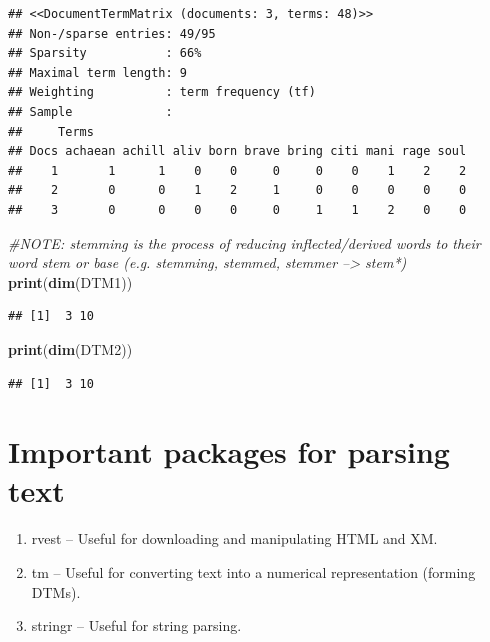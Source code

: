 \documentclass[]{book}
\newenvironment{Shaded}{\begin{snugshade}}{\end{snugshade}}
\newcommand{\KeywordTok}[1]{\textcolor[rgb]{0.13,0.29,0.53}{\textbf{#1}}}
\newcommand{\CommentTok}[1]{\textcolor[rgb]{0.56,0.35,0.01}{\textit{#1}}}
\newcommand{\NormalTok}[1]{#1}
\providecommand{\tightlist}{%
  \setlength{\itemsep}{0pt}\setlength{\parskip}{0pt}}
\theoremstyle{definition}
\theoremstyle{definition}
\theoremstyle{definition}
\theoremstyle{remark}
\begin{document}
\begin{verbatim}
## <<DocumentTermMatrix (documents: 3, terms: 48)>>
## Non-/sparse entries: 49/95
## Sparsity           : 66%
## Maximal term length: 9
## Weighting          : term frequency (tf)
## Sample             :
##     Terms
## Docs achaean achill aliv born brave bring citi mani rage soul
##    1       1      1    0    0     0     0    0    1    2    2
##    2       0      0    1    2     1     0    0    0    0    0
##    3       0      0    0    0     0     1    1    2    0    0
\end{verbatim}

\begin{Shaded}
\begin{Highlighting}[]
\CommentTok{#NOTE: stemming is the process of reducing inflected/derived words to their word stem or base (e.g. stemming, stemmed, stemmer --> stem*)}
\KeywordTok{print}\NormalTok{(}\KeywordTok{dim}\NormalTok{(DTM1))}
\end{Highlighting}
\end{Shaded}

\begin{verbatim}
## [1]  3 10
\end{verbatim}

\begin{Shaded}
\begin{Highlighting}[]
\KeywordTok{print}\NormalTok{(}\KeywordTok{dim}\NormalTok{(DTM2))}
\end{Highlighting}
\end{Shaded}

\begin{verbatim}
## [1]  3 10
\end{verbatim}

\section{Important packages for parsing
text}\label{important-packages-for-parsing-text}

\begin{enumerate}
\def\labelenumi{\arabic{enumi}.}
\tightlist
\item
  rvest -- Useful for downloading and manipulating HTML and XM.
\item
  tm -- Useful for converting text into a numerical representation
  (forming DTMs).
\item
  stringr -- Useful for string parsing.
\end{enumerate}
\end{document}
